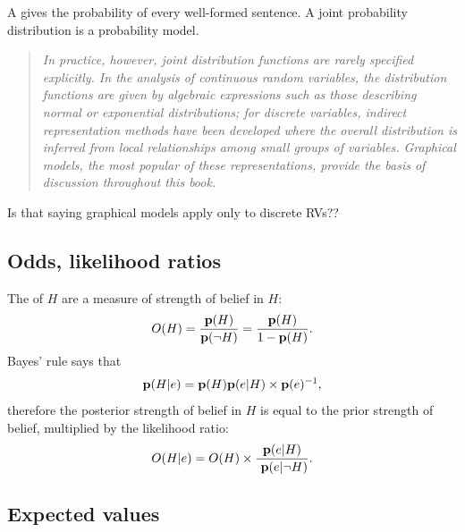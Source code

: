 A  gives the probability of every well-formed sentence. A joint probability distribution is a probability model.

\begin{quote}
  {\it In practice, however, joint distribution functions are rarely specified explicitly. In
    the analysis of continuous random variables, the distribution functions are given by
    algebraic expressions such as those describing normal or exponential distributions; for
    discrete variables, indirect representation methods have been developed where the overall
    distribution is inferred from local relationships among small groups of variables.
    Graphical models, the most popular of these representations, provide the basis of
    discussion throughout this book.}
\end{quote}

\begin{question}
  Is that saying graphical models apply only to discrete RVs??
\end{question}



\subsection{Odds, likelihood ratios}

The  of $H$ are a measure of strength of belief in $H$:
\begin{align*}
  O(H) = \frac{\mathbf{p}(H)}{\mathbf{p}(\lnot H)} = \frac{\mathbf{p}(H)}{1 - \mathbf{p}(H)}.
\end{align*}
Bayes' rule says that
\begin{align*}
 \mathbf{p}(H|e) = \mathbf{p}(H) \mathbf{p}(e|H) \times \mathbf{p}(e)^{-1},
\end{align*}
therefore the posterior strength of belief in $H$ is equal to the prior strength of belief, multiplied by the likelihood ratio:
\begin{align*}
  O(H|e) = O(H) \times \frac{\mathbf{p}(e|H)}{~\mathbf{p}(e|\lnot H)}.
\end{align*}

\subsection{Expected values}

